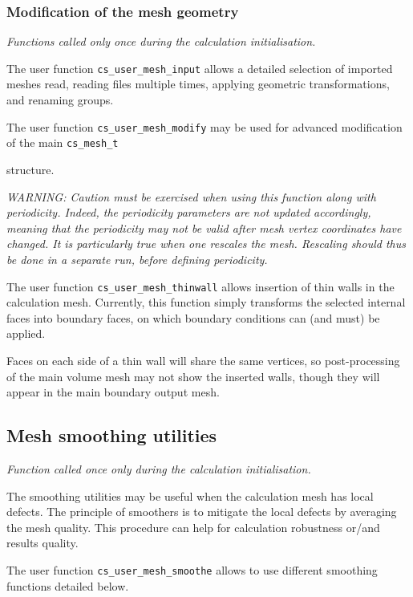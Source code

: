 {{{%
\subsubsection{Modification of the mesh geometry}
\noindent
\textit{Functions called only once during the calculation initialisation.}

The user function \texttt{cs\_user\_mesh\_input} allows a detailed
selection of imported meshes read, reading files multiple times,
applying geometric transformations, and renaming groups.

The user function \texttt{cs\_user\_mesh\_modify} may be used
for advanced modification of the main \texttt{cs\_mesh\_t}} structure.

{\em WARNING: Caution must be exercised when using this function
along with periodicity. Indeed, the periodicity parameters are not
updated accordingly, meaning that the periodicity may not be valid
after mesh vertex coordinates have changed. It is particularly
true when one rescales the mesh. Rescaling should thus be done
in a separate run, before defining periodicity.}

The user function \texttt{cs\_user\_mesh\_thinwall} allows
insertion of thin walls in the calculation mesh. Currently, this
function simply transforms the selected internal faces into boundary
faces, on which boundary conditions can (and must) be applied.

Faces on each side of a thin wall will share the same vertices,
so post-processing of the main volume mesh may not show the
inserted walls, though they will appear in the main boundary
output mesh.

\subsection{Mesh smoothing utilities}
\noindent
\textit{Function called once only during the calculation initialisation.}

The smoothing utilities may be useful when the calculation mesh has local
defects.
The principle of smoothers is to mitigate the local defects by averaging
the mesh quality. This procedure can help for calculation robustness or/and
results quality.

The user function \texttt{cs\_user\_mesh\_smoothe} allows to use different
smoothing functions detailed below.

}}
